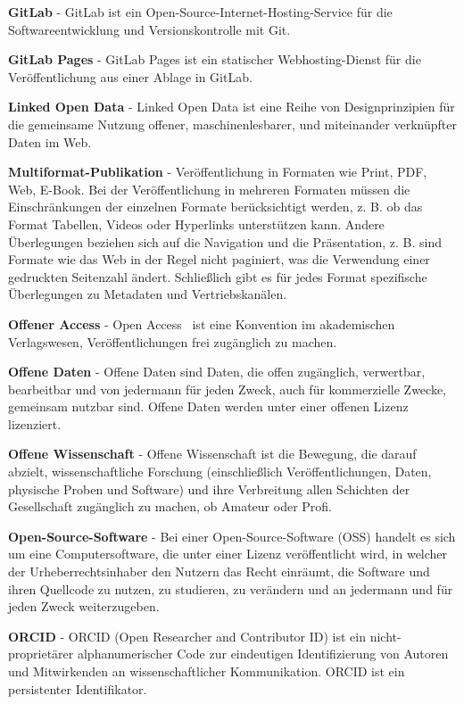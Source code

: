 \documentclass{article}
\begin{document}
\textbf{GitLab} - GitLab ist ein Open-Source-Internet-Hosting-Service für die Softwareentwicklung und Versionskontrolle mit Git.


\textbf{GitLab Pages} - GitLab Pages ist ein statischer Webhosting-Dienst für die Veröffentlichung aus einer Ablage in GitLab.


\textbf{Linked Open Data} - Linked Open Data ist eine Reihe von Designprinzipien für die gemeinsame Nutzung offener, maschinenlesbarer, und miteinander verknüpfter Daten im Web.


\textbf{Multiformat-Publikation} - Veröffentlichung in Formaten wie Print, PDF, Web, E-Book. Bei der Veröffentlichung in mehreren Formaten müssen die Einschränkungen der einzelnen Formate berücksichtigt werden, z. B. ob das Format Tabellen, Videos oder Hyperlinks unterstützen kann. Andere Überlegungen beziehen sich auf die Navigation und die Präsentation, z. B. sind Formate wie das Web in der Regel nicht paginiert, was die Verwendung einer gedruckten Seitenzahl ändert. Schließlich gibt es für jedes Format spezifische Überlegungen zu Metadaten und Vertriebskanälen.


\textbf{Offener Access} - Open Access  ist eine Konvention im akademischen Verlagswesen, Veröffentlichungen frei zugänglich zu machen.


\textbf{Offene Daten} - Offene Daten sind Daten, die offen zugänglich, verwertbar, bearbeitbar und von jedermann für jeden Zweck, auch für kommerzielle Zwecke, gemeinsam nutzbar sind. Offene Daten werden unter einer offenen Lizenz lizenziert.


\textbf{Offene Wissenschaft} - Offene Wissenschaft ist die Bewegung, die darauf abzielt, wissenschaftliche Forschung (einschließlich Veröffentlichungen, Daten, physische Proben und Software) und ihre Verbreitung allen Schichten der Gesellschaft zugänglich zu machen, ob Amateur oder Profi.


\textbf{Open-Source-Software} - Bei einer Open-Source-Software (OSS) handelt es sich um eine Computersoftware, die unter einer Lizenz veröffentlicht wird, in welcher der Urheberrechtsinhaber den Nutzern das Recht einräumt, die Software und ihren Quellcode zu nutzen, zu studieren, zu verändern und an jedermann und für jeden Zweck weiterzugeben.


\textbf{ORCID} - ORCID (Open Researcher and Contributor ID) ist ein nicht-proprietärer alphanumerischer Code zur eindeutigen Identifizierung von Autoren und Mitwirkenden an wissenschaftlicher Kommunikation. ORCID ist ein persistenter Identifikator.
\end{document}
